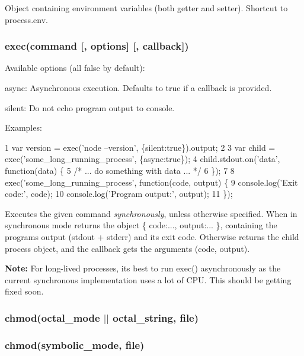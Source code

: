 Object containing environment variables (both getter and setter). Shortcut to process.\+env.

\subsubsection*{exec(command \mbox{[}, options\mbox{]} \mbox{[}, callback\mbox{]})}

Available options (all {\ttfamily false} by default)\+:


\begin{DoxyItemize}
\item {\ttfamily async}\+: Asynchronous execution. Defaults to true if a callback is provided.
\item {\ttfamily silent}\+: Do not echo program output to console.
\end{DoxyItemize}

Examples\+:


\begin{DoxyCode}
1 var version = exec('node --version', \{silent:true\}).output;
2 
3 var child = exec('some\_long\_running\_process', \{async:true\});
4 child.stdout.on('data', function(data) \{
5   /* ... do something with data ... */
6 \});
7 
8 exec('some\_long\_running\_process', function(code, output) \{
9   console.log('Exit code:', code);
10   console.log('Program output:', output);
11 \});
\end{DoxyCode}


Executes the given {\ttfamily command} {\itshape synchronously}, unless otherwise specified. When in synchronous mode returns the object {\ttfamily \{ code\+:..., output\+:... \}}, containing the program\textquotesingle{}s {\ttfamily output} (stdout + stderr) and its exit {\ttfamily code}. Otherwise returns the child process object, and the {\ttfamily callback} gets the arguments {\ttfamily (code, output)}.

{\bfseries Note\+:} For long-\/lived processes, it\textquotesingle{}s best to run {\ttfamily exec()} asynchronously as the current synchronous implementation uses a lot of C\+P\+U. This should be getting fixed soon.

\subsubsection*{chmod(octal\+\_\+mode $\vert$$\vert$ octal\+\_\+string, file)}

\subsubsection*{chmod(symbolic\+\_\+mode, file)}

